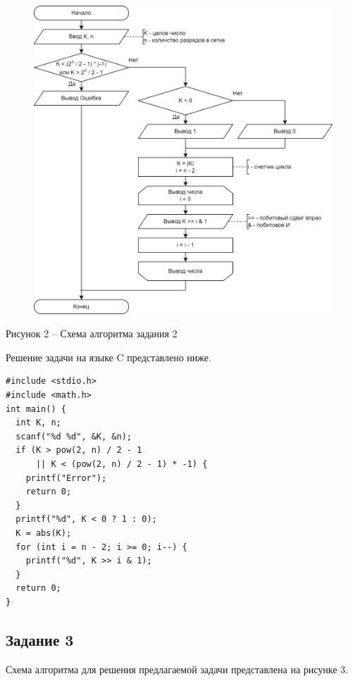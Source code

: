 \documentclass[a4paper,14pt]{extarticle}
\begin{document}
  \begin{figure}[h]
    \centering
    \includegraphics[width=0.8\linewidth]{schemes/s-2}
  \end{figure}
  \begin{center}
    Рисунок 2 – Схема алгоритма задания 2
  \end{center}
  \pagebreak

  Решение задачи на языке C представлено ниже.

  \begin{lstlisting}[tabsize=2,basicstyle=\ttfamily]
#include <stdio.h>
#include <math.h>
int main() {
  int K, n;
  scanf("%d %d", &K, &n);
  if (K > pow(2, n) / 2 - 1 
      || K < (pow(2, n) / 2 - 1) * -1) {
    printf("Error");
    return 0;
  }
  printf("%d", K < 0 ? 1 : 0);
  K = abs(K);
  for (int i = n - 2; i >= 0; i--) {
    printf("%d", K >> i & 1);
  }
  return 0;
}
  \end{lstlisting}

  \pagebreak
  \subsection*{Задание 3}
  Схема алгоритма для решения предлагаемой задачи представлена на рисунке 3.
\end{document}
